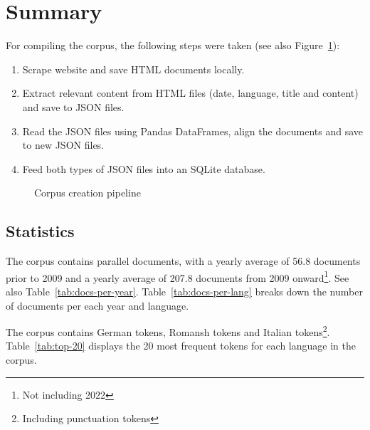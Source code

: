 \section{Summary}
For compiling the corpus, the following steps were taken (see also Figure~\ref{fig:corpus-creation-pipeline}):
\begin{enumerate}
	\item Scrape website and save HTML documents locally.
	\item Extract relevant content from HTML files (date, language, title and content) and save to JSON files.
	\item Read the JSON files using Pandas DataFrames, align the documents and save to new JSON files.
	\item Feed both types of JSON files into an SQLite database.
\end{enumerate}

\begin{figure}
\centering
{}
\caption{Corpus creation pipeline}
\label{fig:corpus-creation-pipeline}
\end{figure}


\subsection{Statistics}
The corpus contains  parallel documents, with a yearly average of 56.8 documents prior to 2009 and a yearly average of 207.8 documents from 2009 onward\footnote{Not including 2022}. 
See also Table~\ref{tab:docs-per-year}. Table~\ref{tab:docs-per-lang} breaks down the number of documents per each year and language. 

The corpus contains  German tokens,  Romansh tokens and  Italian tokens\footnote{Including punctuation tokens}. Table~\ref{tab:top-20} displays the 20 most frequent tokens for each language in the corpus.


